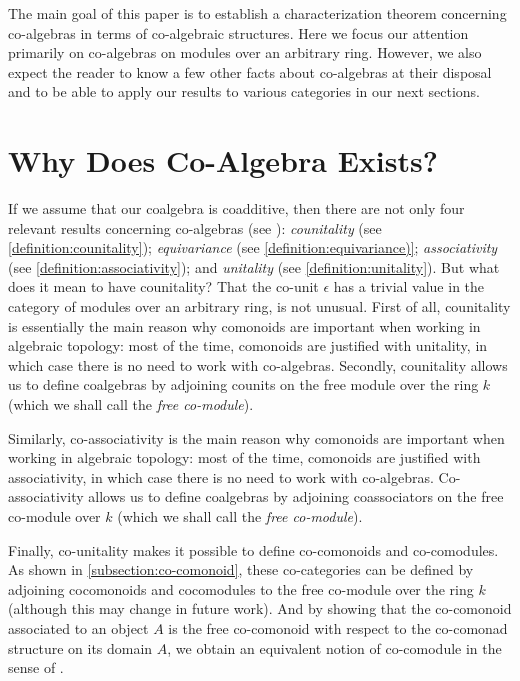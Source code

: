 \documentclass[a4paper,reqno,oneside]{article}
\begin{document}
The main goal of this paper is to establish a characterization theorem concerning co-algebras in terms of co-algebraic structures.  Here we focus our attention primarily on co-algebras on modules over an arbitrary ring.  However, we also expect the reader to know a few other facts about co-algebras at their disposal and to be able to apply our results to various categories in our next sections.


\section{Why Does Co-Algebra Exists?}
If we assume that our coalgebra is coadditive, then there are not only four relevant results concerning co-algebras (see \cite[Chap II.4]{BourkeBook}): \emph{counitality} (see \cref{definition:counitality}); \emph{equivariance} (see \cref{definition:equivariance)}; \emph{associativity} (see \cref{definition:associativity}); and \emph{unitality} (see \cref{definition:unitality}).  But what does it mean to have counitality?  That the co-unit $\epsilon$ has a trivial value in the category of modules over an arbitrary ring, is not unusual.  First of all, counitality is essentially the main reason why comonoids are important when working in algebraic topology: most of the time, comonoids are justified with unitality, in which case there is no need to work with co-algebras.  Secondly, counitality allows us to define coalgebras by adjoining counits on the free module over the ring $k$ (which we shall call the \emph{free co-module}).




Similarly, co-associativity is the main reason why comonoids are important when working in algebraic topology: most of the time, comonoids are justified with associativity, in which case there is no need to work with co-algebras.  Co-associativity allows us to define coalgebras by adjoining coassociators on the free co-module over $k$ (which we shall call the \emph{free co-module}).

Finally, co-unitality makes it possible to define co-comonoids and co-comodules.  As shown in \cref{subsection:co-comonoid}, these co-categories can be defined by adjoining cocomonoids and cocomodules to the free co-module over the ring $k$ (although this may change in future work).  And by showing that the co-comonoid associated to an object $A$ is the free co-comonoid with respect to the co-comonad structure on its domain $A$, we obtain an equivalent notion of co-comodule in the sense of \cite{BourkeBook}.
\end{document}
